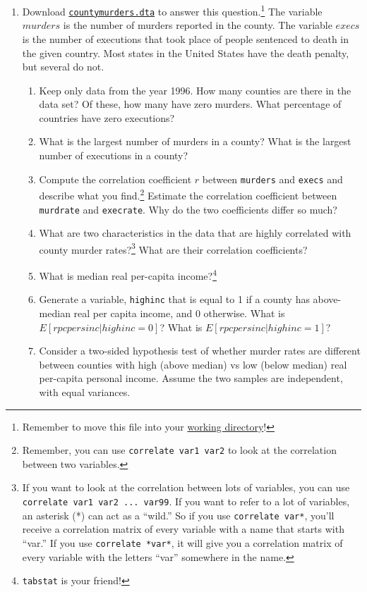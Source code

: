 \documentclass[
]{article}
\begin{document}
\begin{enumerate}
\def\labelenumi{\arabic{enumi}.}
\setcounter{enumi}{6}
\item
  Download \href{../countymurders.dta}{\texttt{countymurders.dta}} to
  answer this question.\footnote{Remember to move this file into your
    \href{../01-lab/\#working-directories-important}{working directory}!}
  The variable \(murders\) is the number of murders reported in the
  county. The variable \(execs\) is the number of executions that took
  place of people sentenced to death in the given country. Most states
  in the United States have the death penalty, but several do not.

  \begin{enumerate}
  \def\labelenumii{\alph{enumii}.}
  \item
    Keep only data from the year 1996. How many counties are there in
    the data set? Of these, how many have zero murders. What percentage
    of countries have zero executions?
  \item
    What is the largest number of murders in a county? What is the
    largest number of executions in a county?
  \item
    Compute the correlation coefficient \(r\) between \texttt{murders}
    and \texttt{execs} and describe what you find.\footnote{Remember,
      you can use \texttt{correlate\ var1\ var2} to look at the
      correlation between two variables.} Estimate the correlation
    coefficient between \texttt{murdrate} and \texttt{execrate}. Why do
    the two coefficients differ so much?
  \item
    What are two characteristics in the data that are highly correlated
    with county murder rates?\footnote{If you want to look at the
      correlation between lots of variables, you can use
      \texttt{correlate\ var1\ var2\ ...\ var99}. If you want to refer
      to a lot of variables, an asterisk (*) can act as a ``wild.'' So
      if you use \texttt{correlate\ var*}, you'll receive a correlation
      matrix of every variable with a name that starts with ``var.'' If
      you use \texttt{correlate\ *var*}, it will give you a correlation
      matrix of every variable with the letters ``var'' somewhere in the
      name.} What are their correlation coefficients?
  \item
    What is median real per-capita income?\footnote{\texttt{tabstat} is
      your friend!}
  \item
    Generate a variable, \texttt{highinc} that is equal to 1 if a county
    has above-median real per capita income, and 0 otherwise. What is
    \(E[rpcpersinc  | highinc =0]\)? What is
    \(E[rpcpersinc | highinc =1]\)?
  \item
    Consider a two-sided hypothesis test of whether murder rates are
    different between counties with high (above median) vs low (below
    median) real per-capita personal income. Assume the two samples are
    independent, with equal variances.


\end{enumerate}
\end{enumerate}
\end{document}
